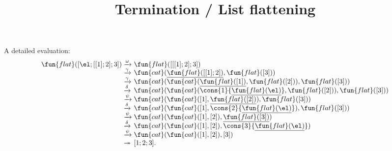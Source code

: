 \documentclass[wide]{slides}
\begin{document}
\begin{slide}
  \title{Termination / List flattening}

  A detailed evaluation:
    \begin{equation*}
      \begin{array}{r@{\;}l@{\;}l}
        \fun{flat}([\el;[[1];2];3])
        & \xrightarrow{\omega}
        & \fun{flat}([[[1];2];3])\\
        & \xrightarrow{\smash{\gamma}}
        & \fun{cat}(\underline{\fun{flat}([[1];2])},\fun{flat}([3]))\\
        & \xrightarrow{\smash{\gamma}}
        & \fun{cat}(\fun{cat}(\underline{\fun{flat}([1])},\fun{flat}([2])),
        \fun{flat}([3]))\\
        & \xrightarrow{\smash{\delta}}
        & \fun{cat}(\fun{cat}(\cons{1}{\underline{\fun{flat}(\el)}},
        \fun{flat}([2])), \fun{flat}([3]))\\
        & \xrightarrow{\smash{\psi}}
        & \fun{cat}(\fun{cat}([1],\underline{\fun{flat}([2])}),
        \fun{flat}([3]))\\
        & \xrightarrow{\smash{\delta}}
        & \fun{cat}(\fun{cat}([1],\cons{2}{\underline{\fun{flat}(\el)}}),
        \fun{flat}([3]))\\
        & \xrightarrow{\smash{\psi}}
        & \fun{cat}(\fun{cat}([1],[2]),\underline{\fun{flat}([3])})\\
        & \xrightarrow{\smash{\delta}}
        & \fun{cat}(\fun{cat}([1],[2]),\cons{3}{\underline{\fun{flat}(\el)}})\\
        & \xrightarrow{\smash{\psi}}
        & \fun{cat}(\fun{cat}([1],[2]),[3])\\
        & \twoheadrightarrow & [1;2;3].
      \end{array}
    \end{equation*}

\end{slide}
\end{document}

